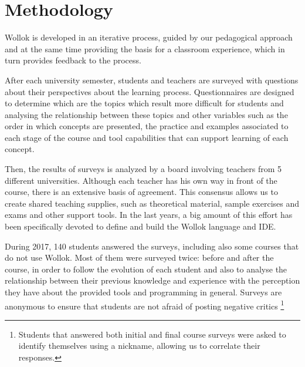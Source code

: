 \section{Methodology}
\label{sec:methodology}
Wollok is developed in an iterative process, guided by our pedagogical approach 
and at the same time providing the basis for a classroom experience, 
which in turn provides feedback to the process.

After each university semester, students and teachers are surveyed with questions about their perspectives about the learning process.
Questionnaires are designed to determine which are the topics which result more difficult for students 
and analysing the relationship between these topics and other variables such as 
the order in which concepts are presented,
the practice and examples associated to each stage of the course
and tool capabilities that can support learning of each concept.

Then, the results of surveys is analyzed by a board involving teachers from 5 different universities.
Although each teacher has his own way in front of the course, there is an extensive basis of agreement.
This consensus allows us to create shared teaching supplies, such as theoretical material, sample exercises and exams and other support tools.
In the last years, a big amount of this effort has been specifically devoted to define and build the Wollok language and IDE.

\medskip

During 2017, 140 students answered the surveys, including also some courses that do not use Wollok.
Most of them were surveyed twice: before and after the course, in order to follow the evolution of each student
and also to analyse the relationship between their previous knowledge and experience with the perception they have about the provided tools and programming in general.
Surveys are anonymous to ensure that students are not afraid of posting negative critics%
\footnote{Students that answered both initial and final course surveys were asked to identify themselves using a nickname, allowing us to correlate their responses.}


